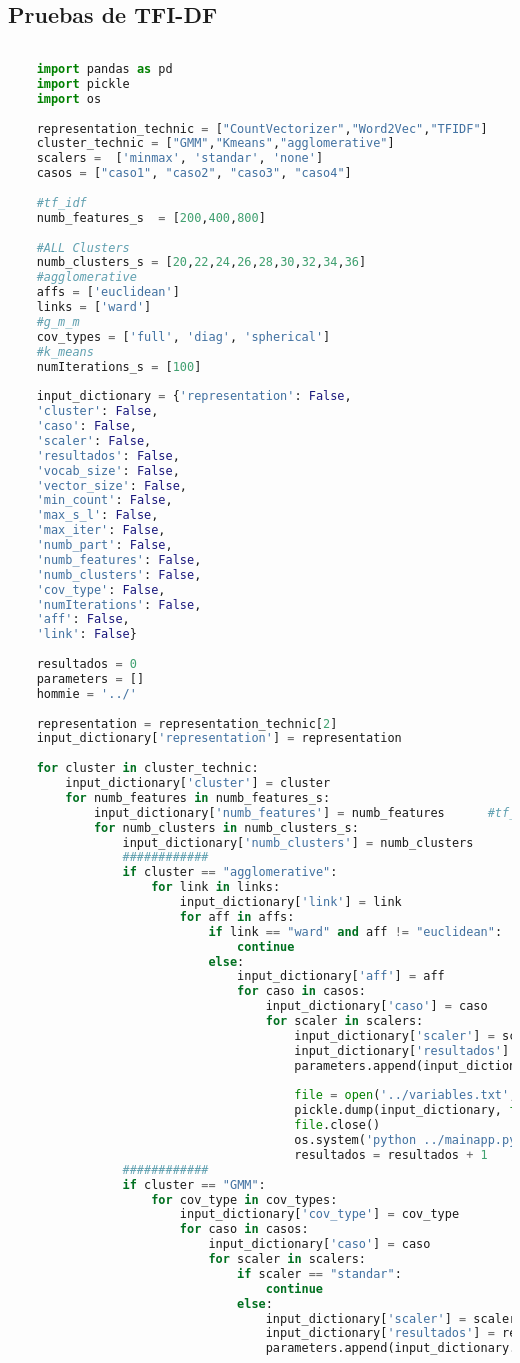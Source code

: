 \documentclass[12pt]{article}
\begin{document}
	\subsection{Pruebas de TFI-DF}
	\begin{lstlisting}[language=Python, 
	caption = Rutina de pruebas TFI-DF,
	label={lst:pruebasTfIdf}]
	
	import pandas as pd
	import pickle
	import os
	
	representation_technic = ["CountVectorizer","Word2Vec","TFIDF"]
	cluster_technic = ["GMM","Kmeans","agglomerative"]
	scalers =  ['minmax', 'standar', 'none']
	casos = ["caso1", "caso2", "caso3", "caso4"]
	
	#tf_idf
	numb_features_s  = [200,400,800]
	
	#ALL Clusters
	numb_clusters_s = [20,22,24,26,28,30,32,34,36]
	#agglomerative
	affs = ['euclidean']
	links = ['ward']
	#g_m_m
	cov_types = ['full', 'diag', 'spherical']
	#k_means
	numIterations_s = [100]
	
	input_dictionary = {'representation': False,
	'cluster': False,
	'caso': False,
	'scaler': False,
	'resultados': False,
	'vocab_size': False,
	'vector_size': False,
	'min_count': False,
	'max_s_l': False,
	'max_iter': False,
	'numb_part': False,
	'numb_features': False,
	'numb_clusters': False,
	'cov_type': False,
	'numIterations': False,
	'aff': False,
	'link': False}
	
	resultados = 0
	parameters = []
	hommie = '../'
	
	representation = representation_technic[2]
	input_dictionary['representation'] = representation
	
	for cluster in cluster_technic:
		input_dictionary['cluster'] = cluster
		for numb_features in numb_features_s:
			input_dictionary['numb_features'] = numb_features      #tf_idf
			for numb_clusters in numb_clusters_s:
				input_dictionary['numb_clusters'] = numb_clusters
				############
				if cluster == "agglomerative":
					for link in links:
						input_dictionary['link'] = link
						for aff in affs:
							if link == "ward" and aff != "euclidean":
								continue
							else:
								input_dictionary['aff'] = aff                
								for caso in casos:
									input_dictionary['caso'] = caso
									for scaler in scalers:
										input_dictionary['scaler'] = scaler
										input_dictionary['resultados'] = resultados    
										parameters.append(input_dictionary.copy())                            
										
										file = open('../variables.txt', 'wb')
										pickle.dump(input_dictionary, file)
										file.close()
										os.system('python ../mainapp.py')
										resultados = resultados + 1 
				############
				if cluster == "GMM":
					for cov_type in cov_types:
						input_dictionary['cov_type'] = cov_type             
						for caso in casos:
							input_dictionary['caso'] = caso
							for scaler in scalers:
								if scaler == "standar":
									continue
								else:
									input_dictionary['scaler'] = scaler
									input_dictionary['resultados'] = resultados  
									parameters.append(input_dictionary.copy())     
									

\end{lstlisting}
\end{document}
